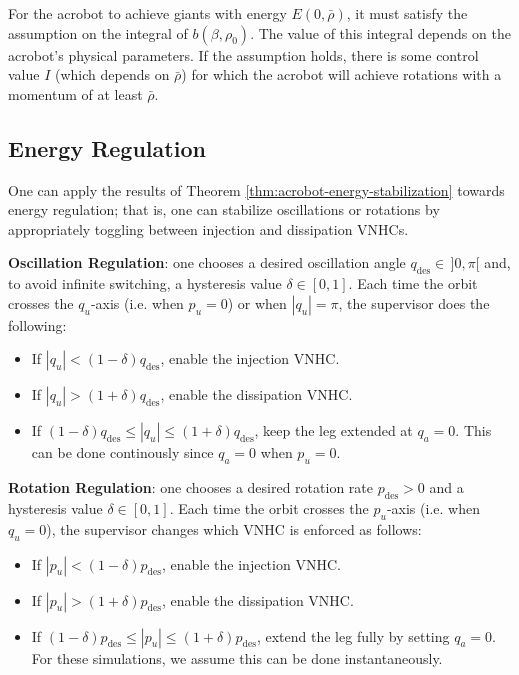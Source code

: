 \documentclass[journal,twoside,onecolumn,draftclsnofoot,web]{ieeecolor}
\begin{document}
{For the acrobot to achieve giants with energy
\(E(0,\bar{\rho})\), it must satisfy the assumption on the integral
of \(b(\beta,\rho_0)\). 
The value of this integral depends on the acrobot's physical parameters.
If the assumption holds, there is some control value \(I\)
(which depends on \(\bar{\rho}\)) for which the acrobot will 
achieve rotations with a momentum of at least \(\bar{\rho}\).

\subsection{Energy Regulation}\label{sec:energy-reg}
One can apply the results of Theorem \ref{thm:acrobot-energy-stabilization} 
towards energy regulation;
that is, one can stabilize oscillations or rotations by appropriately toggling
between injection and dissipation VNHCs.

\textbf{Oscillation Regulation}: one chooses a desired oscillation angle 
\(q_\text{des} \in \, ]0,\pi[\) and, to avoid infinite switching, a
hysteresis value \(\delta \in [0,1]\).
Each time the orbit crosses the \(q_u\)-axis (i.e. when \(p_u = 0\)) or 
when \(|q_u| = \pi\), the supervisor does the following: 
\begin{itemize}
    \item If \(|q_u| < (1-\delta)q_\text{des}\), enable the injection VNHC.
    \item If \(|q_u| > (1+\delta)q_\text{des}\), enable the dissipation VNHC.
    \item If \((1-\delta)q_\text{des} \leq |q_u| \leq (1+\delta)q_\text{des}\),
        keep the leg extended at \(q_a = 0\). This can be done continously since
        \(q_a = 0\) when \(p_u = 0\).
\end{itemize}

\textbf{Rotation Regulation}: one chooses a desired rotation rate 
\(p_\text{des} > 0\) and a hysteresis value \(\delta \in [0,1]\).
Each time the orbit crosses the \(p_u\)-axis (i.e. when \(q_u = 0\)), the
supervisor changes which VNHC is enforced as follows:
\begin{itemize}
    \item If \(|p_u| < (1-\delta)p_\text{des}\), enable the injection VNHC.
    \item If \(|p_u| > (1+\delta)p_\text{des}\), enable the dissipation VNHC.
    \item If \((1-\delta)p_\text{des} \leq |p_u| \leq (1+\delta)p_\text{des}\),
        extend the leg fully by setting \(q_a = 0\).
        For these simulations, we assume this can be done instantaneously.
\end{itemize}

}
\end{document}
